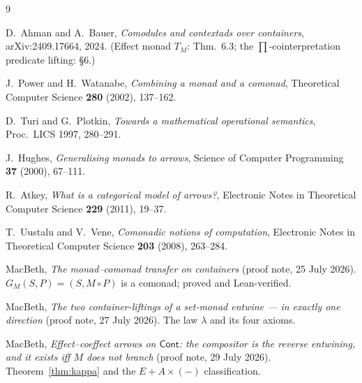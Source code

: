 \documentclass[11pt]{article}
\theoremstyle{plain}
\theoremstyle{definition}
\theoremstyle{remark}
\newcommand{\Cont}{\mathsf{Cont}}
\begin{document}
\begin{thebibliography}{9}

D.~Ahman and A.~Bauer,
\emph{Comodules and contextads over containers},
arXiv:2409.17664, 2024. (Effect monad $T_M$: Thm.~6.3; the
$\prod$-cointerpretation predicate lifting: \S6.)

J.~Power and H.~Watanabe,
\emph{Combining a monad and a comonad},
Theoretical Computer Science \textbf{280} (2002), 137--162.

D.~Turi and G.~Plotkin,
\emph{Towards a mathematical operational semantics},
Proc.\ LICS 1997, 280--291.

J.~Hughes,
\emph{Generalising monads to arrows},
Science of Computer Programming \textbf{37} (2000), 67--111.

R.~Atkey,
\emph{What is a categorical model of arrows?},
Electronic Notes in Theoretical Computer Science \textbf{229} (2011), 19--37.

T.~Uustalu and V.~Vene,
\emph{Comonadic notions of computation},
Electronic Notes in Theoretical Computer Science \textbf{203} (2008), 263--284.

MacBeth,
\emph{The monad--comonad transfer on containers} (proof note, 25 July 2026).
$G_M(S,P)=(S,M\circ P)$ is a comonad; proved and Lean-verified.

MacBeth,
\emph{The two container-liftings of a set-monad entwine --- in exactly one direction}
(proof note, 27 July 2026). The law $\lambda$ and its four axioms.

MacBeth,
\emph{Effect--coeffect arrows on $\Cont$: the compositor is the reverse entwining, and
it exists iff $M$ does not branch} (proof note, 29 July 2026). Theorem~\ref{thm:kappa}
and the $E+A\times(-)$ classification.

\end{thebibliography}
\end{document}
